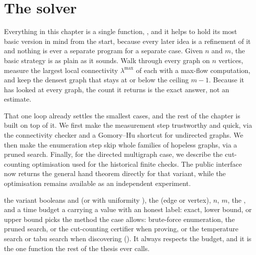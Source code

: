 \section{The solver}

Everything in this chapter is a single function, , and it helps to hold its most basic version in mind from the start, because every later idea is a refinement of it and nothing is ever a separate program for a separate case. Given $n$ and $m$, the basic strategy is as plain as it sounds. Walk through every graph on $n$ vertices, measure the largest local connectivity $\lambda^{\max}$ of each with a max-flow computation, and keep the densest graph that stays at or below the ceiling $m - 1$. Because it has looked at every graph, the count it returns is the exact answer, not an estimate.

That one loop already settles the smallest cases, and the rest of the chapter is built on top of it. We first make the measurement step trustworthy and quick, via the connectivity checker and a Gomory--Hu shortcut for undirected graphs. We then make the enumeration step skip whole families of hopeless graphs, via a pruned search. Finally, for the directed multigraph case, we describe the cut-counting optimisation used for the historical finite checks. The public  interface now returns the general hand theorem directly for that variant, while the optimisation remains available as an independent experiment.

{the variant booleans  and  (or  with uniformity ), the  (edge or vertex), $n$, $m$, the , and a time budget }
{a  carrying a value with an honest label: exact, lower bound, or upper bound}
{picks the method the case allows: brute-force enumeration, the pruned search, or the cut-counting certifier when proving, or the temperature search or tabu search when discovering (). It always respects the budget, and it is the one function the rest of the thesis ever calls.}


